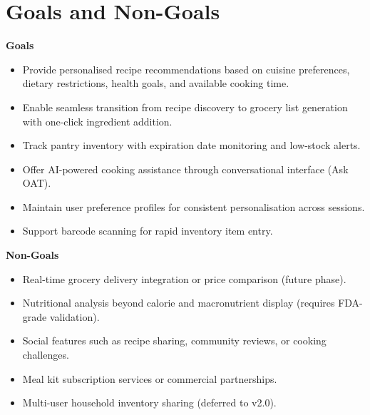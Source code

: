 \documentclass[12pt]{article}
\begin{document}
\section{Goals and Non-Goals}
\textbf{Goals}
\begin{itemize}
  \item Provide personalised recipe recommendations based on cuisine preferences, dietary restrictions, health goals, and available cooking time.
  \item Enable seamless transition from recipe discovery to grocery list generation with one-click ingredient addition.
  \item Track pantry inventory with expiration date monitoring and low-stock alerts.
  \item Offer AI-powered cooking assistance through conversational interface (Ask OAT).
  \item Maintain user preference profiles for consistent personalisation across sessions.
  \item Support barcode scanning for rapid inventory item entry.
\end{itemize}
\textbf{Non-Goals}
\begin{itemize}
  \item Real-time grocery delivery integration or price comparison (future phase).
  \item Nutritional analysis beyond calorie and macronutrient display (requires FDA-grade validation).
  \item Social features such as recipe sharing, community reviews, or cooking challenges.
  \item Meal kit subscription services or commercial partnerships.
  \item Multi-user household inventory sharing (deferred to v2.0).
\end{itemize}
\end{document}
